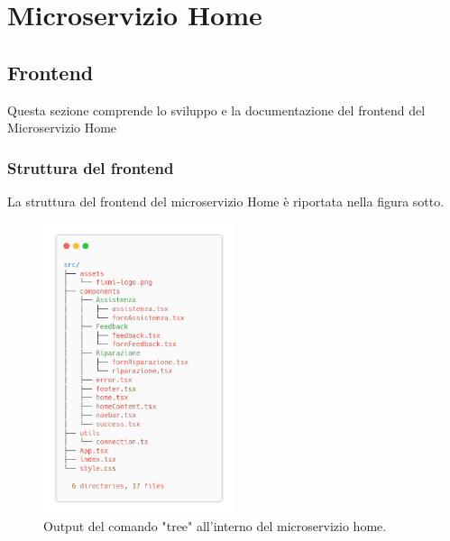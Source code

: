 \documentclass{report}
\begin{document}
\chapter{Microservizio Home}

\section{Frontend}

Questa sezione comprende lo sviluppo e la documentazione del frontend del Microservizio Home

\subsection{Struttura del frontend}
La struttura del frontend del microservizio Home è riportata
nella figura sotto.
\begin{figure}[H]
	\centering\includegraphics[width=0.5\textwidth]{images/microservizio-home/frontend-structure.png}
	\caption{Output del comando "tree" all'interno del microservizio home.}
\end{figure}
\end{document}
